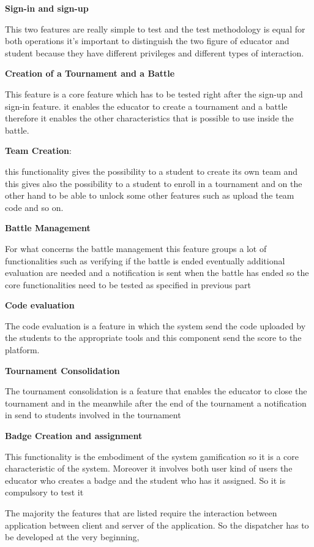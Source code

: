 \begin{enumerate}[label={[\textbf{F\arabic*}]}]

\item \textbf{Sign-in and sign-up}

This two features are really simple to test and the test methodology is equal for both operations it's important to distinguish the two figure of educator and student because they have different privileges and different types of interaction.
\item \textbf{Creation of a Tournament and a Battle}

This feature is a core feature which has to be tested right after the sign-up and sign-in feature.
it enables the educator to create a tournament and a battle therefore it enables the other characteristics that is possible to use inside the battle.

\item \textbf{Team Creation}:

this functionality gives the possibility to a student to create its own team and this gives also the possibility to a student to enroll in a tournament and on the other hand to be able to unlock some other features such as  upload the team code and so on.

\item \textbf{Battle Management}

For what concerns the battle management this feature groups a lot of functionalities such as verifying if the battle is ended eventually additional evaluation are needed and a notification is sent when the battle has ended so the core functionalities need to be tested as specified in previous part

\item  \textbf{Code evaluation}

The code evaluation is a feature in which the system send the code uploaded by the students to the appropriate tools and this component send the score to the platform. 

\item \textbf{Tournament Consolidation}

The tournament consolidation is a feature that enables the educator to close the tournament and in the meanwhile after the end of the tournament a notification in send to students involved in the tournament
\item \textbf{Badge Creation and assignment}

This functionality is the embodiment of the system gamification so it is a core characteristic of the system. Moreover it involves both user kind of users the educator who creates a badge and the student who has it assigned. So it is compulsory to test it

\end{enumerate} 
\pagebreak
The majority the features that are listed require the interaction  between application between client and server of the application.
So the dispatcher has to be developed at the very beginning,



